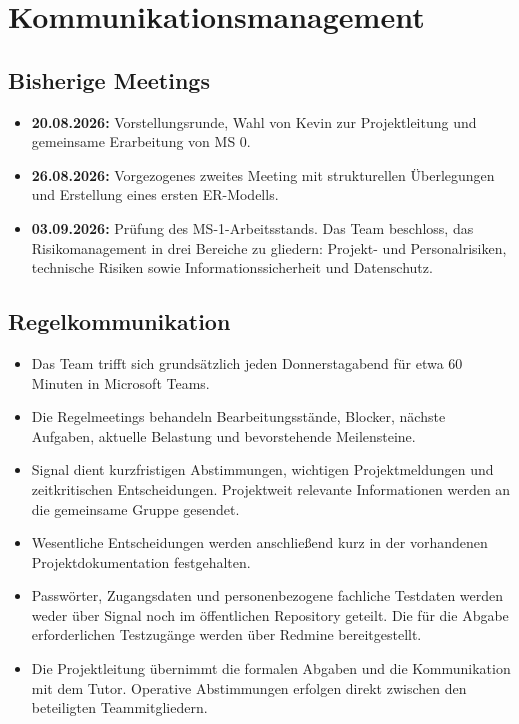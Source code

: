 \documentclass[11pt,a4paper]{article}
\begin{document}
\section{Kommunikationsmanagement}

\subsection{Bisherige Meetings}

\begin{itemize}
\item \textbf{20.08.2026:} Vorstellungsrunde, Wahl von Kevin zur Projektleitung und gemeinsame Erarbeitung von MS 0.
\item \textbf{26.08.2026:} Vorgezogenes zweites Meeting mit strukturellen Überlegungen und Erstellung eines ersten ER-Modells.
\item \textbf{03.09.2026:} Prüfung des MS-1-Arbeitsstands. Das Team beschloss, das Risikomanagement in drei Bereiche zu gliedern: Projekt- und Personalrisiken, technische Risiken sowie Informationssicherheit und Datenschutz.
\end{itemize}

\subsection{Regelkommunikation}

\begin{itemize}
\item Das Team trifft sich grundsätzlich jeden Donnerstagabend für etwa 60 Minuten in Microsoft Teams.
\item Die Regelmeetings behandeln Bearbeitungsstände, Blocker, nächste Aufgaben, aktuelle Belastung und bevorstehende Meilensteine.
\item Signal dient kurzfristigen Abstimmungen, wichtigen Projektmeldungen und zeitkritischen Entscheidungen. Projektweit relevante Informationen werden an die gemeinsame Gruppe gesendet.
\item Wesentliche Entscheidungen werden anschließend kurz in der vorhandenen Projektdokumentation festgehalten.
\item Passwörter, Zugangsdaten und personenbezogene fachliche Testdaten werden weder über Signal noch im öffentlichen Repository geteilt. Die für die Abgabe erforderlichen Testzugänge werden über Redmine bereitgestellt.
\item Die Projektleitung übernimmt die formalen Abgaben und die Kommunikation mit dem Tutor. Operative Abstimmungen erfolgen direkt zwischen den beteiligten Teammitgliedern.
\end{itemize}
\end{document}
